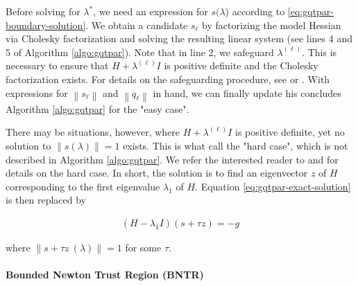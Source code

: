 \noindent Before solving for $\lambda^*$, we need an expression for $s(\lambda$) according to \ref{eq:gqtpar-boundary-solution}. We obtain a candidate $s_\ell$ by factorizing the model Hessian via Cholesky factorization and solving the resulting linear system (see lines 4 and 5 of Algorithm \ref{algo:gqtpar}). Note that in line 2, we safeguard $\lambda^{(\ell)}$. This is necessary to ensure that $H + \lambda^{(\ell)} I$ is positive definite and the Cholesky factorization exists. For details on the safeguarding procedure, see \cite{More1983} or \cite{Nocedal2006}. With expressions for $\left\|s_{\ell}\right\|$ and $\left\|q_{\ell}\right\|$ in hand, we can finally update his concludes Algorithm \ref{algo:gqtpar} for the "easy case".


\noindent There may be situations, however, where $H + \lambda^{(\ell)} I$ is positive definite, yet no solution to $ \lVert s (\lambda)  \rVert = 1 $ exists. This is what \cite{More1983} call the "hard case", which is not described in Algorithm \ref{algo:gqtpar}. We refer the interested reader to \cite{More1983} and \cite{Conn2000} for details on the hard case. In short, the solution is to find an eigenvector $z$ of $H$ corresponding to the first eigenvalue $\lambda_1$ of $H$. Equation \ref{eq:gqtpar-exact-solution} is then replaced by

\begin{align}
    \left(H-\lambda_1 I\right)(s+\tau z)=-g
    \label{eq:hard-case}
\end{align}

\noindent where $ \lVert s +\tau z \ (\lambda) \rVert  = 1  $ for some $\tau$.


\paragraph{Bounded Newton Trust Region (BNTR)}




